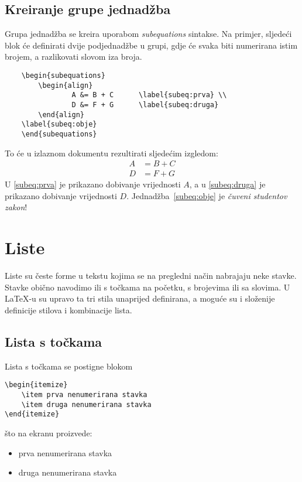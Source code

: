 \subsection{Kreiranje grupe jednadžba}
Grupa jednadžba se kreira uporabom \emph{subequations} sintakse. Na primjer, sljedeći blok će definirati dvije podjednadžbe u grupi, gdje će svaka biti numerirana istim brojem, a razlikovati slovom iza broja.
\begin{verbatim}
	\begin{subequations}
		\begin{align}
		        A &= B + C  	\label{subeq:prva} \\
		        D &= F + G		\label{subeq:druga}
		\end{align}
	\label{subeq:obje}
	\end{subequations}
\end{verbatim}

To će u izlaznom dokumentu rezultirati sljedećim izgledom:
\begin{subequations}
\begin{align}
        A &= B + C  	\label{subeq:prva} \\
        D &= F + G		\label{subeq:druga}
\end{align}
\label{subeq:obje}
\end{subequations}
U \eqref{subeq:prva} je prikazano dobivanje vrijednosti $A$, a u \eqref{subeq:druga} je prikazano dobivanje vrijednosti $D$. Jednadžba~\eqref{subeq:obje} je \emph{čuveni studentov zakon}!



\section{Liste}
Liste su česte forme u tekstu kojima se na pregledni način nabrajaju neke stavke. Stavke obično navodimo ili s točkama na početku, s brojevima ili sa slovima. U \LaTeX-u su upravo ta tri stila unaprijed definirana, a moguće su i složenije definicije stilova i kombinacije lista.

\subsection{Lista s točkama}
Lista s točkama se postigne blokom
\begin{verbatim}
\begin{itemize}
    \item prva nenumerirana stavka
    \item druga nenumerirana stavka
\end{itemize}
\end{verbatim}
što na ekranu proizvede:
\begin{itemize}
	\item prva nenumerirana stavka
	\item druga nenumerirana stavka
\end{itemize}

